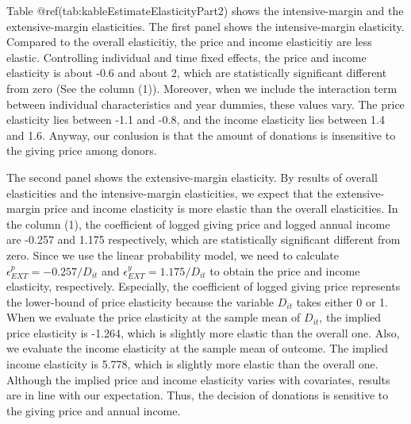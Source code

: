 \documentclass[
]{article}
\begin{document}
Table @ref(tab:kableEstimateElasticityPart2) shows the intensive-margin and the extensive-margin elasticities.
The first panel shows the intensive-margin elasticity.
Compared to the overall elasticitiy, the price and income elasticitiy are less elastic.
Controlling individual and time fixed effects,
the price and income elasticity is about -0.6 and about 2,
which are statistically significant different from zero (See the column (1)).
Moreover, when we include the interaction term between individual characteristics and year dummies,
these values vary.
The price elasticity lies between -1.1 and -0.8,
and the income elasticity lies between 1.4 and 1.6.
Anyway, our conlusion is that the amount of donations is insensitive to the giving price among donors.

The second panel shows the extensive-margin elasticity.
By results of overall elasticities and the intensive-margin elasticities,
we expect that the extensive-margin price and income elasticity is more elastic than the overall elasticities.
In the column (1), the coefficient of logged giving price and logged annual income are -0.257 and 1.175 respectively,
which are statistically significant different from zero.
Since we use the linear probability model,
we need to calculate \(\epsilon^p_{EXT} = -0.257/D_{it}\) and \(\epsilon^y_{EXT} = 1.175/D_{it}\)
to obtain the price and income elasticity, respectively.
Especially, the coefficient of logged giving price represents the lower-bound of price elasticity
because the variable \(D_{it}\) takes either 0 or 1.
When we evaluate the price elasticity at the sample mean of \(D_{it}\),
the implied price elasticity is -1.264, which is slightly more elastic than the overall one.
Also, we evaluate the income elasticity at the sample mean of outcome.
The implied income elasticity is 5.778, which is slightly more elastic than the overall one.
Although the implied price and income elasticity varies with covariates,
results are in line with our expectation.
Thus, the decision of donations is sensitive to the giving price and annual income.
\end{document}
